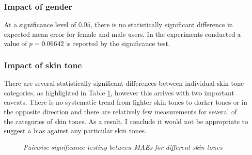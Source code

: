 



\subsubsection{Impact of gender}
At a significance level of $0.05$, there is no statistically significant difference in expected mean error for female and male users. In the experiments conducted a value of $p=0.06642$ is reported by the significance test.
\begin{figure}[H]
    \centering
    \quad
    \quad
    \quad
\end{figure}

\subsubsection{Impact of skin tone}
There are several statistically significant differences between individual skin tone categories, as highlighted in Table \ref{table:skin_tone_p}, however this arrives with two important caveats.
There is no systematic trend from lighter skin tones to darker tones or in the opposite direction and there are relatively few measurements for several of the categories of skin tones.
As a result, I conclude it would not be appropriate to suggest a bias against any particular skin tones.
\begin{figure}[H]
    \centering
    \scalebox{0.7}{}
    \caption{\textit{Pairwise significance testing between MAEs for different skin tones}}
    \label{table:skin_tone_p}
\end{figure}

